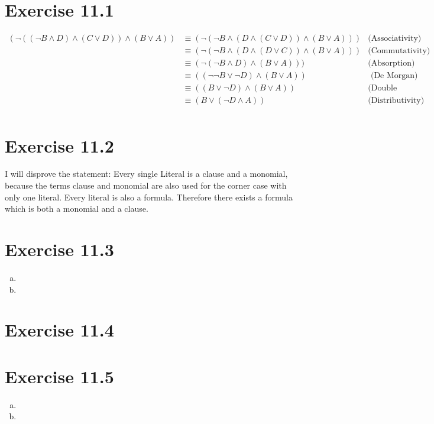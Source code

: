 \documentclass{article} %
\newcommand{\homeworkNumber}{11}
\begin{document}
\section*{Exercise \homeworkNumber.1}
\begin{align*}
	(\neg((\neg B \land D) \land (C \lor D)) \land (B \lor A)) & \equiv (\neg(\neg B \land (D \land (C \lor D)) \land (B \lor A))) & \text{(Associativity)}    \\
	                                                           & \equiv (\neg(\neg B \land (D \land (D \lor C)) \land (B \lor A))) & \text{(Commutativity) }   \\
	                                                           & \equiv (\neg(\neg B \land D) \land (B \lor A)))                   & \text{(Absorption) }      \\
	                                                           & \equiv ((\neg\neg B \lor \neg D) \land (B \lor A))                & \text{ (De Morgan) }      \\
	                                                           & \equiv ((B \lor \neg D) \land (B \lor A))                         & \text{(Double Negation) } \\
	                                                           & \equiv (B \lor ( \neg D \land A))                                 & \text{(Distributivity) }  \\
\end{align*}


\section*{Exercise \homeworkNumber.2}
I will disprove the statement: Every single Literal is a clause and a monomial, because the terms clause and monomial are also used for the corner case with only one literal. Every literal is also a formula. Therefore there exists a formula which is both a monomial and a clause.




\section*{Exercise \homeworkNumber.3}
\begin{enumerate}[(a)]
	\item
	\item
\end{enumerate}



\section*{Exercise \homeworkNumber.4}



\section*{Exercise \homeworkNumber.5}
\begin{enumerate}[(a)]
	\item
	\item
\end{enumerate}
\end{document}
